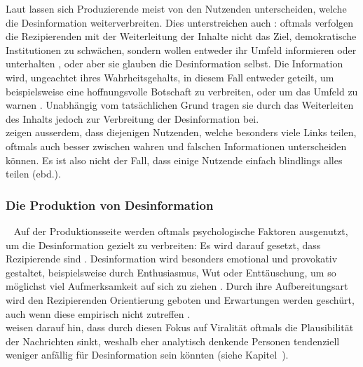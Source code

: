 \documentclass[12pt,a4paper]{article}        %
\begin{document}
\pagebreak
Laut \textcite[3]{tandoc_jr_facts_2019} lassen sich Produzierende meist von den Nutzenden unterscheiden, welche die Desinformation weiterverbreiten. Dies unterstreichen auch \textcite[77]{lecheler_disinformation_2022}: oftmals verfolgen die Rezipierenden mit der Weiterleitung der Inhalte nicht das Ziel, demokratische Institutionen zu schwächen, sondern wollen entweder ihr Umfeld informieren oder unterhalten \parencite[bspw.][]{subramanian_meet_2017}, oder aber sie glauben die Desinformation selbst. Die Information wird, ungeachtet ihres Wahrheitsgehalts, in diesem Fall entweder geteilt, um beispielsweise eine hoffnungsvolle Botschaft zu verbreiten, oder um das Umfeld zu warnen \parencite[182]{weidner_fake_2019}. Unabhängig vom tatsächlichen Grund tragen sie durch das Weiterleiten des Inhalts jedoch zur Verbreitung der Desinformation bei.\\
\textcite[2]{guess_less_2019} zeigen ausserdem, dass diejenigen Nutzenden, welche besonders viele Links teilen, oftmals auch besser zwischen wahren und falschen Informationen unterscheiden können. Es ist also nicht der Fall, dass einige Nutzende einfach blindlings alles teilen (ebd.).

\subsubsection{Die Produktion von Desinformation}
~\label{theory_production}
Auf der Produktionsseite werden oftmals psychologische Faktoren ausgenutzt, um die Desinformation gezielt zu verbreiten: Es wird darauf gesetzt, dass Rezipierende  sind \parencite[8]{burkhardt_history_2017}. Desinformation wird besonders emotional und provokativ gestaltet, beispielsweise durch Enthusiasmus, Wut oder Enttäuschung, um so möglichst viel Aufmerksamkeit auf sich zu ziehen \parencites[42]{levak_disinformation_2020}[18]{grujic_warnhinweise_2024}[5]{tandoc_jr_facts_2019}[170]{wahl_fake_2021}. Durch ihre Aufbereitungsart wird den Rezipierenden Orientierung geboten und Erwartungen werden geschürt, auch wenn diese empirisch nicht zutreffen \parencite[152]{marx_fake_2020}. \\
\textcite[45]{pennycook_lazy_2019} weisen darauf hin, dass durch diesen Fokus auf Viralität oftmals die Plausibilität der Nachrichten sinkt, weshalb eher analytisch denkende Personen tendenziell weniger anfällig für Desinformation sein könnten (siehe Kapitel~).
\end{document}
